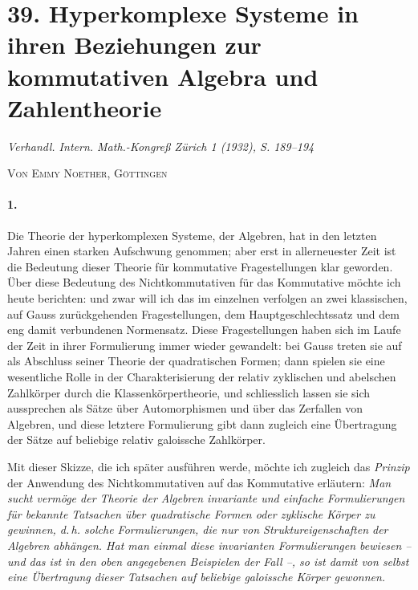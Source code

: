 \section*{39. Hyperkomplexe Systeme in ihren Beziehungen zur kommutativen Algebra und Zahlentheorie}

\begin{center}
\emph{Verhandl. Intern. Math.-Kongreß Zürich 1 (1932), S. 189--194}
\end{center}

\begin{center}
\textsc{Von Emmy Noether, Göttingen}
\end{center}

\paragraph{1.}
Die Theorie der hyperkomplexen Systeme, der Algebren, hat in den letzten Jahren einen starken Aufschwung genommen; aber erst in allerneuester Zeit ist die Bedeutung dieser Theorie für kommutative Fragestellungen klar geworden. Über diese Bedeutung des Nichtkommutativen für das Kommutative möchte ich heute berichten: und zwar will ich das im einzelnen verfolgen an zwei klassischen, auf Gauss zurückgehenden Fragestellungen, dem Hauptgeschlechtssatz und dem eng damit verbundenen Normensatz. Diese Fragestellungen haben sich im Laufe der Zeit in ihrer Formulierung immer wieder gewandelt: bei Gauss treten sie auf als Abschluss seiner Theorie der quadratischen Formen; dann spielen sie eine wesentliche Rolle in der Charakterisierung der relativ zyklischen und abelschen Zahlkörper durch die Klassenkörpertheorie, und schliesslich lassen sie sich aussprechen als Sätze über Automorphismen und über das Zerfallen von Algebren, und diese letztere Formulierung gibt dann zugleich eine Übertragung der Sätze auf beliebige relativ galoissche Zahlkörper.

Mit dieser Skizze, die ich später ausführen werde, möchte ich zugleich das \emph{Prinzip} der Anwendung des Nichtkommutativen auf das Kommutative erläutern: \emph{Man sucht vermöge der Theorie der Algebren invariante und einfache Formulierungen für bekannte Tatsachen über quadratische Formen oder zyklische Körper zu gewinnen, d.\,h. solche Formulierungen, die nur von Struktureigenschaften der Algebren abhängen. Hat man einmal diese invarianten Formulierungen bewiesen -- und das ist in den oben angegebenen Beispielen der Fall --, so ist damit von selbst eine Übertragung dieser Tatsachen auf beliebige galoissche Körper gewonnen.}

